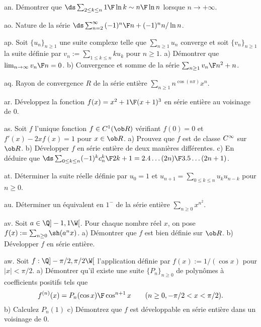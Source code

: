 \exo [Level=2,Fight=1,Learn=1,Field=\DéveloppementsLimités,Type=\Exercices,Origin=\MP] an. 
Démontrer que $\ds \sum_{2\le k\le n}{1\F\ln k}\sim {n\F\ln n}$ lorsque $n\to+\infty$. 

\exo [Level=2,Fight=2,Learn=2,Field=\Séries,Type=\Colles,Origin=\MP] ao.
Nature de la série $\ds\sum_{n=2}^\infty{(-1)^n\F n+(-1)^nn/\ln n}$.

\exo [Level=2,Fight=2,Learn=2,Field=\Séries,Type=\Colles,Origin=\MP] ap. 
Soit $\{u_n\}_{n\ge1}$ une suite complexe telle que $\sum_{n\ge1}u_n$ converge 
et soit $\{v_n\}_{n\ge 1}$ la suite définie par $v_n:=\sum_{1\le k\le n}ku_k$ pour $n\ge1$. \pn
a) Démontrer que $\lim_{n\to\infty}{v_n\F n}=0$. \pn
b) Convergence et somme de la série $\sum_{n\ge1}{v_n\F n^2+n}$. 

\exo [Level=2,Fight=1,Learn=1,Field=\SériesEntières,Type=\Exercices,Origin=] aq. 
Rayon de convergence $R$ de la série entière $\sum_{n\ge1}n^{\cos(n\pi)}x^n$. 

\exo [Level=2,Fight=0,Learn=0,Field=\SériesEntières,Type=\Exercices,Origin=] ar. 
Développez la fonction $f(x)={x^2+1\F(x+1)^3}$ en série entière au voisinage de $0$. 

\exo [Level=2,Fight=2,Learn=2,Field=\SériesEntières,Type=\TravauxDirigés,Origin=] as. 
Soit $f$ l'unique fonction $f\in\sc C^1(\ob R)$ vérifiant $f(0)=0$ 
et $f'(x)-2xf(x)=1$ pour $x\in\ob R$. \pn
a) Prouvez que $f$ est de classe $\sc C^\infty$ sur $\ob R$. \pn
b) Développer $f$ en série entière de deux manières différentes.\pn 
c) En déduire que $\ds\sum_{0\le k\le n}(-1)^k{c_n^k\F 2k+1}={2.4\ldots (2n)\F3.5\ldots(2n+1)}$. 

\exo [Level=2,Fight=2,Learn=1,Field=\SériesEntières,Type=\Exercices,Origin=] at. 
Déterminer la suite réelle définie par $u_0=1$ 
et $u_{n+1}=\sum_{0\le k\le n}u_ku_{n-k}$ pour $n\ge0$. 

\exo [Level=2,Fight=3,Learn=1,Field=\SériesEntières,Type=\Colles,Origin=] au. 
Déterminer un équivalent en $1^-$ de la série entière 
$\sum_{n\ge0}x^{n^2}$.  

\exo [Level=2,Fight=3,Learn=1,Field=\SériesEntières,Type=\Others,Origin=] av. 
Soit $a\in\Q]-1,1\W[$. Pour chaque nombre réel $x$, on pose $f(x):=\sum_{n\ge0}\sh(a^nx)$. \pn
a) Démontrer que $f$ est bien définie sur $\ob R$. \pn
b) Développer $f$ en série entière. 
  

\exo [Level=2,Fight=2,Learn=1,Field=\SériesEntières,Type=\Colles,Origin=] aw. 
Soit $f:\Q]-\pi/2,\pi/2\W[$ l'application définie par $f(x):=1/(\cos x)$ pour $|x|<\pi/2$. \pn
a) Démontrer qu'il existe une suite $\{P_n\}_{n\ge0}$ de polynômes à coefficients positifs tels que 
$$
f^{(n)}(x)={P_n(\cos x)\F\cos^{n+1}x}\qquad(n\ge0,-\pi/2<x<\pi/2). 
$$
b) Calculez $P_n(1)$ \pn
c) Démontrez que $f$ est développable en série entière dans un voisinage de $0$. 

